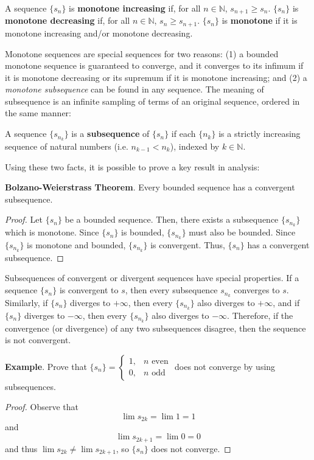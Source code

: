 \begin{shaded}
\begin{defn}
    A sequence $\{s_n\}$ is \textbf{monotone increasing} if, for all $n\in\mathbb{N}$, $s_{n+1}\geq s_n$. $\{s_n\}$ is \textbf{monotone decreasing} if, for all $n\in \mathbb{N}$, $s_n \geq s_{n+1}$. $\{s_n\}$ is \textbf{monotone} if it is monotone increasing and/or monotone decreasing.
\end{defn}

Monotone sequences are special sequences for two reasons: (1) a bounded monotone sequence is guaranteed to converge, and it converges to its infimum if it is monotone decreasing or its supremum if it is monotone increasing; and (2) a \textit{monotone subsequence} can be found in any sequence. The meaning of subsequence is an infinite sampling of terms of an original sequence, ordered in the same manner:
\begin{defn}
    A sequence $\{s_{n_k}\}$ is a \textbf{subsequence} of $\{s_n\}$ if each $\{n_k\}$ is a strictly increasing sequence of natural numbers (i.e. $n_{k-1} < n_k$), indexed by $k\in\mathbb{N}$.
\end{defn}
Using these two facts, it is possible to prove a key result in analysis:

\textbf{Bolzano-Weierstrass Theorem}. Every bounded sequence has a convergent subsequence.

\begin{proof}
    Let $\{s_n\}$ be a bounded sequence. Then, there exists a subsequence $\{s_{n_k}\}$ which is monotone. Since $\{s_n\}$ is bounded, $\{s_{n_k}\}$ must also be bounded. Since $\{s_{n_k}\}$ is monotone and bounded, $\{s_{n_k}\}$ is convergent. Thus, $\{s_n\}$ has a convergent subsequence.
\end{proof}
\end{shaded}

Subsequences of convergent or divergent sequences have special properties. If a sequence $\{s_n\}$ is convergent to $s$, then every subsequence $s_{n_k}$ converges to $s$. Similarly, if $\{s_n\}$ diverges to $+\infty$, then every $\{s_{n_k}\}$ also diverges to $+\infty$, and if $\{s_n\}$ diverges to $-\infty$, then every $\{s_{n_k}\}$ also diverges to $-\infty$. Therefore, if the convergence (or divergence) of any two subsequences disagree, then the sequence is not convergent.

\textbf{Example}. Prove that $\{s_n\} = \begin{cases}
    1, & n \text{ even}\\
    0, & n\text{ odd}
\end{cases}$ does not converge by using subsequences.
\begin{proof}
    Observe that \[\lim s_{2k} = \lim 1 = 1\] and \[\lim s_{2k+1} = \lim 0 = 0\] and thus $\lim s_{2k} \neq \lim s_{2k+1}$, so $\{s_n\}$ does not converge.
\end{proof}

